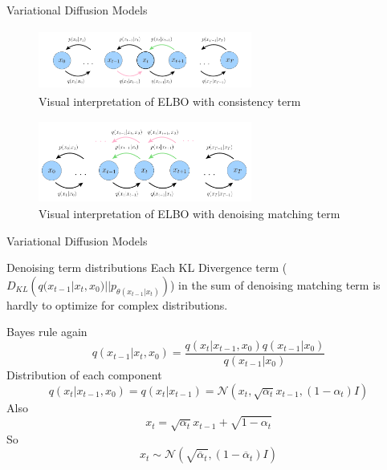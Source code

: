 \documentclass{beamer}
\begin{document}
\begin{frame}{Variational Diffusion Models}
    \begin{figure}[h]
    \centering
    \includegraphics[width=7cm, height=2cm]{diffusion_4.png}
    \caption{Visual interpretation of ELBO with consistency term}
    \end{figure}
    \begin{figure}[h]
    \centering
    \includegraphics[width=7cm, height=2.7cm]{diffusion_5.png}
    \caption{Visual interpretation of ELBO with denoising matching term}
    \end{figure}
\end{frame}

\begin{frame}{Variational Diffusion Models}
    \begin{block}{Denoising term distributions}
    Each KL Divergence term ($D_{KL}\left(q(x_{t-1}|x_t, x_0) || p_{\theta(x_{t-1}|x_t)}\right)$) in the sum of denoising matching term is hardly to optimize for complex distributions.

    Bayes rule again
    \[q(x_{t-1}|x_t, x_0) = \dfrac{q(x_t|x_{t-1}, x_0)q(x_{t-1}|x_0)}{q(x_{t-1}|x_0)}\]
    Distribution of each component
    \[q(x_t|x_{t-1}, x_0) = q(x_t|x_{t-1}) = \mathcal{N}(x_t, \sqrt{\alpha_t}x_{t-1}, (1-\alpha_t)I)\]
    Also
    \[x_t = \sqrt{\alpha_t}x_{t-1} + \sqrt{1 - \alpha_t}\]
    So
    \[x_t \sim \mathcal{N}\left(\sqrt{\overline\alpha_t}, (1 - \overline\alpha_t)I\right)\]
    \end{block}
\end{frame}
\end{document}

